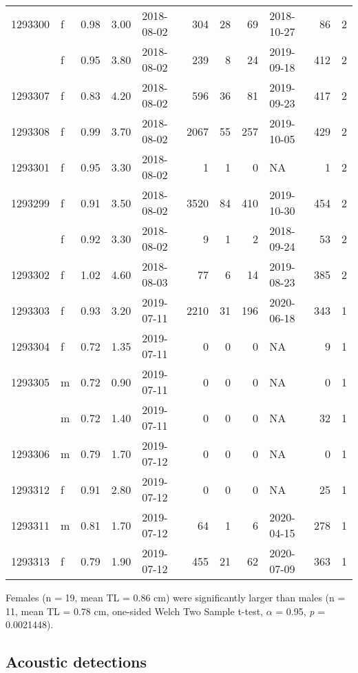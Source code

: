 \documentclass[
  authoryear,
  review,
  3p]{elsarticle}
\begin{document}
\begin{table}[H]
\begin{tabular}{llrrlrrrlrr}
1293300 & f & 0.98 & 3.00 & 2018-08-02 & 304 & 28 & 69 & 2018-10-27 & 86 & 2\\
\addlinespace
1293298 & f & 0.95 & 3.80 & 2018-08-02 & 239 & 8 & 24 & 2019-09-18 & 412 & 2\\
1293307 & f & 0.83 & 4.20 & 2018-08-02 & 596 & 36 & 81 & 2019-09-23 & 417 & 2\\
1293308 & f & 0.99 & 3.70 & 2018-08-02 & 2067 & 55 & 257 & 2019-10-05 & 429 & 2\\
1293301 & f & 0.95 & 3.30 & 2018-08-02 & 1 & 1 & 0 & NA & 1 & 2\\
1293299 & f & 0.91 & 3.50 & 2018-08-02 & 3520 & 84 & 410 & 2019-10-30 & 454 & 2\\
\addlinespace
1293309 & f & 0.92 & 3.30 & 2018-08-02 & 9 & 1 & 2 & 2018-09-24 & 53 & 2\\
1293302 & f & 1.02 & 4.60 & 2018-08-03 & 77 & 6 & 14 & 2019-08-23 & 385 & 2\\
1293303 & f & 0.93 & 3.20 & 2019-07-11 & 2210 & 31 & 196 & 2020-06-18 & 343 & 1\\
1293304 & f & 0.72 & 1.35 & 2019-07-11 & 0 & 0 & 0 & NA & 9 & 1\\
1293305 & m & 0.72 & 0.90 & 2019-07-11 & 0 & 0 & 0 & NA & 0 & 1\\
\addlinespace
1293310 & m & 0.72 & 1.40 & 2019-07-11 & 0 & 0 & 0 & NA & 32 & 1\\
1293306 & m & 0.79 & 1.70 & 2019-07-12 & 0 & 0 & 0 & NA & 0 & 1\\
1293312 & f & 0.91 & 2.80 & 2019-07-12 & 0 & 0 & 0 & NA & 25 & 1\\
1293311 & m & 0.81 & 1.70 & 2019-07-12 & 64 & 1 & 6 & 2020-04-15 & 278 & 1\\
1293313 & f & 0.79 & 1.90 & 2019-07-12 & 455 & 21 & 62 & 2020-07-09 & 363 & 1\\
\bottomrule
\end{tabular}
\end{table}

Females (n = 19, mean TL = 0.86 cm) were significantly larger than males
(n = 11, mean TL = 0.78 cm, one-sided Welch Two Sample t-test,
\(\alpha\) = 0.95, \emph{p} = 0.0021448).

\hypertarget{acoustic-detections-1}{%
\subsection{Acoustic detections}\label{acoustic-detections-1}}
\end{document}
